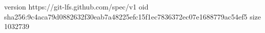 version https://git-lfs.github.com/spec/v1
oid sha256:9c4aca79d0882632f30eab7a48225efc15f1ec7836372ec07e1688779ac54ef5
size 1032739
